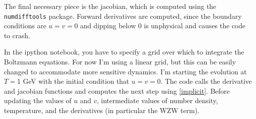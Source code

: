 \documentclass[superscriptaddress,nofootinbib,notitlepage,onecolumn]{revtex4-1}
\newcommand{\code}[1]{\texttt{#1}}
\begin{document}
The final necessary piece is the jacobian, which is computed using the \code{numdifftools} package. Forward derivatives are computed, since the boundary conditions are $u = v = 0$ and dipping below 0 is unphysical and causes the code to crash.

In the ipython notebook, you have to specify a grid over which to integrate the Boltzmann equations. For now I'm using a linear grid, but this can be easily changed to accommodate more sensitive dynamics. I'm starting the evolution at $T=$1 GeV with the initial condition that $u= v= 0$. The code calls the derivative and jacobian functions and computes the next step using \eqref{implicit}. Before updating the values of $u$ and $v$, intermediate values of number density, temperature, and the derivatives (in particular the WZW term).
\end{document}
